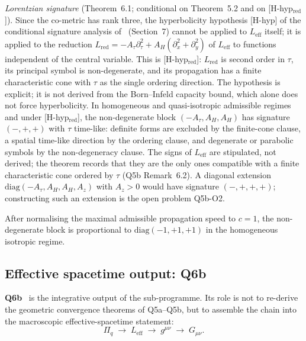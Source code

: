 \documentclass[11pt,a4paper]{article}
\theoremstyle{definition}
\newcommand{\Leff}{L_{\mathrm{eff}}}
\newcommand{\geff}{g^{\mu\nu}}
\newcommand{\Atau}{A_\tau}
\newcommand{\AH}{A_H}
\begin{document}
      \textit{Lorentzian signature} (Theorem~6.1; conditional on Theorem~5.2 and on [H-hyp$_{\mathrm{red}}$]).
      Since the co-metric has rank three, the hyperbolicity hypothesis [H-hyp] of the conditional
      signature analysis of~\cite{Beau2026c} (Section~7) cannot be applied to $\Leff$ itself; it is applied to the
      reduction $L_{\mathrm{red}} = -\Atau\partial_\tau^2 + \AH(\partial_x^2 + \partial_y^2)$ of
      $\Leff$ to functions independent of the central variable.
      This is [H-hyp$_{\mathrm{red}}$]: $L_{\mathrm{red}}$ is second order in $\tau$, its principal symbol
      is non-degenerate, and its propagation has a finite characteristic cone with $\tau$ as the
      single ordering direction.
      The hypothesis is explicit; it is not derived from the Born--Infeld capacity bound, which
      alone does not force hyperbolicity.
      In homogeneous and quasi-isotropic admissible regimes and under [H-hyp$_{\mathrm{red}}$], the
      non-degenerate block $(-\Atau, \AH, \AH)$ has signature $(-,+,+)$ with $\tau$ time-like:
      definite forms are excluded by the finite-cone clause, a spatial time-like direction by the
      ordering clause, and degenerate or parabolic symbols by the non-degeneracy clause.
      The signs of $\Leff$ are stipulated, not derived; the theorem records that they are the
      only ones compatible with a finite characteristic cone ordered by $\tau$ (Q5b Remark~6.2).
      A diagonal extension $\mathrm{diag}(-\Atau, \AH, \AH, A_z)$ with $A_z > 0$ would have
      signature $(-,+,+,+)$; constructing such an extension is the open problem Q5b-O2.

      After normalising the maximal admissible propagation speed to $c = 1$, the non-degenerate
      block is proportional to $\mathrm{diag}(-1, +1, +1)$ in the homogeneous isotropic
      regime.

    \subsection{Effective spacetime output: Q6b}
      \label{sec:q6b}

      \textbf{Q6b}~\cite{Beau2026q6b} is the integrative output of the sub-programme.
      Its role is not to re-derive the geometric convergence theorems of Q5a--Q5b, but to assemble
      the chain into the macroscopic effective-spacetime statement:
      \[
        \Pi_q \;\longrightarrow\; \Leff \;\longrightarrow\; \geff \;\longrightarrow\; G_{\mu\nu}.
      \]
\end{document}
